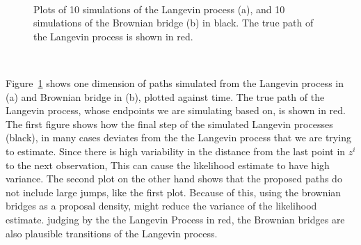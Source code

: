 \

\begin{figure}[H]%
    \centering
    \qquad
    \caption{Plots of 10 simulations of the Langevin process (a), and 10 simulations of the Brownian bridge (b) in black. The true path of the Langevin process is shown in red.}%
    \label{fig:monte carlo paths}%
\end{figure}

\

Figure~\ref{fig:monte carlo paths} shows one dimension of paths simulated from the Langevin process in (a) and Brownian bridge in (b), plotted against time. The true path of the Langevin process, whose endpoints we are simulating based on, is shown in red. The first figure shows how the final step of the simulated Langevin processes (black), in many cases deviates from the the Langevin process that we are trying to estimate. Since there is high variability in the distance from the last point in $z^i$ to the next observation, This can cause the likelihood estimate to have high variance. The second plot on the other hand shows that the proposed paths do not include large jumps, like the first plot. Because of this, using the brownian bridges as a proposal density, might reduce the variance of the likelihood estimate. judging by the the Langevin Process in red, the Brownian bridges are also plausible transitions of the Langevin process. 

